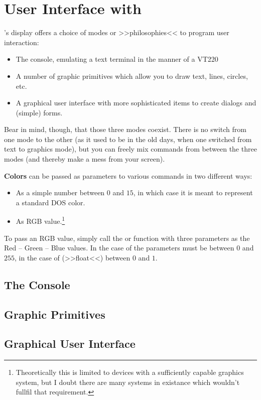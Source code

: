 \chapter{User Interface with \SB \label{cUse}}


\absatz

\SB's display offers a choice of modes or >>philosophies<< to program
user interaction:

\begin{itemize}

\item The console, emulating a text terminal in the manner of a VT220

\item A number of graphic primitives which allow you to draw text,
lines, circles, etc.

\item A graphical user interface with more sophisticated items to create
dialogs and (simple) forms.

\end{itemize}

Bear in mind, though, that those three modes coexist. There is no switch
from one mode to the other (as it used to be in the old days, when one
switched from text to graphics mode), but you can freely mix commands
from between the three modes (and thereby make a mess from your screen).

\textbf{Colors} can be passed as parameters to various commands in two
different ways:

\begin{itemize}

\item As a simple number between $0$ and $15$, in which case it is meant
to represent a standard DOS color.

\item As RGB value.\footnote{Theoretically this is limited to devices
with a sufficiently capable graphics system, but I doubt there are many
systems in existance which wouldn't fullfil that requirement.}

\end{itemize}

To pass an RGB value, simply call the  or 
function with three parameters as the Red -- Green -- Blue values. In
the case of  the parameters must be between $0$ and $255$, in the
case of  (>>float<<) between $0$ and $1$.

\section{The Console \label{cConsole}}



\section{Graphic Primitives \label{cGraphics}}

\section{Graphical User Interface \label{cGUI}}

